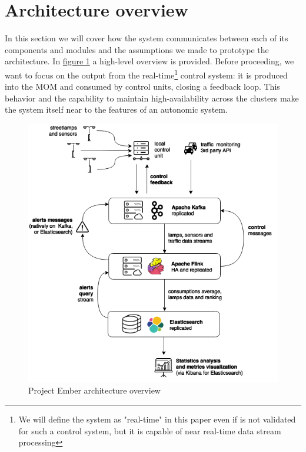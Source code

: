 \section{Architecture overview}
In this section we will cover how the system communicates between each of its components and modules and the assumptions we made to prototype the architecture. In \hyperref[fig:ember_architecture]{figure 1} a high-level overview is provided. Before proceeding, we want to focus on the output from the real-time\footnote{We will define the system as "real-time" in this paper even if is not validated for such a control system, but it is capable of near real-time data stream processing} control system: it is produced into the MOM and consumed by control units, closing a feedback loop. This behavior and the capability to maintain high-availability across the clusters make the system itself near to the features of an autonomic system.
\begin{figure}[!b]
\begin{center}
	\includegraphics[scale=0.35]{img/ember_architecture}
	\caption{Project Ember architecture overview}
	\label{fig:ember_architecture}
\end{center}
\end{figure}

